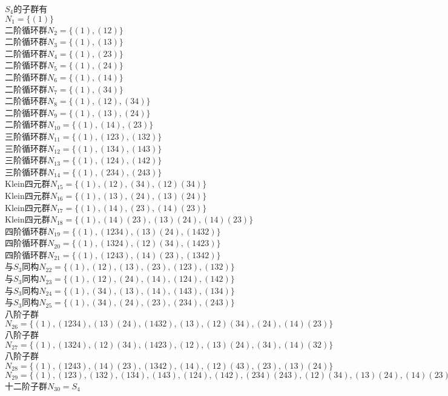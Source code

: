 \documentclass[a4paper, justified]{tufte-handout}
\begin{document}
\begin{solution}
	$S_4$的子群有\\
	$N_1=\{(1)\}$\\
	二阶循环群$N_2=\{(1),(12)\}$\\
	二阶循环群$N_3=\{(1),(13)\}$\\
	二阶循环群$N_4=\{(1),(23)\}$\\
	二阶循环群$N_5=\{(1),(24)\}$\\
	二阶循环群$N_6=\{(1),(14)\}$\\
	二阶循环群$N_7=\{(1),(34)\}$\\
	二阶循环群$N_8=\{(1),(12),(34)\}$\\
	二阶循环群$N_9=\{(1),(13),(24)\}$\\
	二阶循环群$N_{10}=\{(1),(14),(23)\}$\\
	三阶循环群$N_{11}=\{(1),(123),(132)\}$\\
	三阶循环群$N_{12}=\{(1),(134),(143)\}$\\
	三阶循环群$N_{13}=\{(1),(124),(142)\}$\\
	三阶循环群$N_{14}=\{(1),(234),(243)\}$\\
	Klein四元群$N_{15}=\{(1),(12),(34),(12)(34)\}$\\
	Klein四元群$N_{16}=\{(1),(13),(24),(13)(24)\}$\\
	Klein四元群$N_{17}=\{(1),(14),(23),(14)(23)\}$\\
	Klein四元群$N_{18}=\{(1),(14)(23),(13)(24),(14)(23)\}$\\
	四阶循环群$N_{19}=\{(1),(1234),(13)(24),(1432)\}$\\
	四阶循环群$N_{20}=\{(1),(1324),(12)(34),(1423)\}$\\
	四阶循环群$N_{21}=\{(1),(1243),(14)(23),(1342)\}$\\
	与$S_3$同构$N_{22}=\{(1),(12),(13),(23),(123),(132)\}$\\
	与$S_3$同构$N_{23}=\{(1),(12),(24),(14),(124),(142)\}$\\
	与$S_3$同构$N_{24}=\{(1),(34),(13),(14),(143),(134)\}$\\
	与$S_3$同构$N_{25}=\{(1),(34),(24),(23),(234),(243)\}$\\
	八阶子群$N_{26}=\{(1),(1234),(13)(24),(1432),(13),(12)(34),(24),(14)(23)\}$\\
	八阶子群$N_{27}=\{(1),(1324),(12)(34),(1423),(12),(13)(24),(34),(14)(32)\}$\\
	八阶子群$N_{28}=\{(1),(1243),(14)(23),(1342),(14),(12)(43),(23),(13)(24)\}$\\
	$N_{29}=\{(1),(123),(132),(134),(143),(124),(142),(234)(243),(12)(34),(13)(24),(14)(23)\}$\\
	十二阶子群$N_{30}=S_4$
\end{solution}
\end{document}

